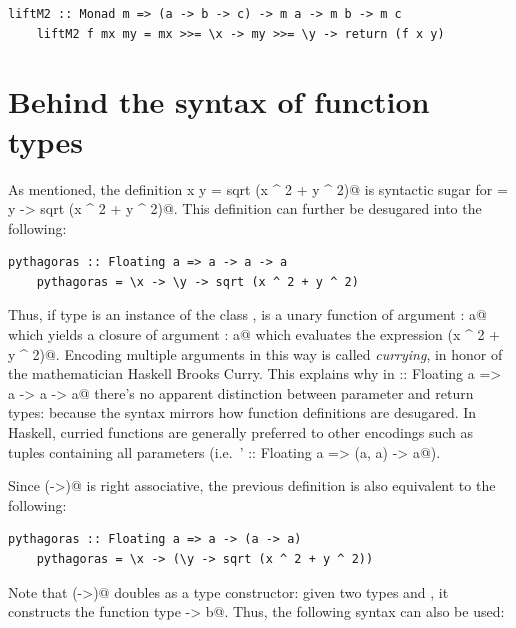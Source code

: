 \documentclass[UdineBachThesis,american,11pt]{PhdThesis}
\begin{document}
  \begin{lstlisting}[gobble=4,basicstyle=\ttfamily\small]
    liftM2 :: Monad m => (a -> b -> c) -> m a -> m b -> m c
    liftM2 f mx my = mx >>= \x -> my >>= \y -> return (f x y)
  \end{lstlisting}

  \newpage

  \section{Behind the syntax of function types}

  As mentioned, the definition \lstinline@pythagoras x y = sqrt (x ^ 2 + y ^ 2)@
  is syntactic sugar for \lstinline@pythagoras = \x y -> sqrt (x ^ 2 + y ^ 2)@.
  This definition can further be desugared into the following:

  \begin{lstlisting}[gobble=4,basicstyle=\ttfamily\small]
    pythagoras :: Floating a => a -> a -> a
    pythagoras = \x -> \y -> sqrt (x ^ 2 + y ^ 2)
  \end{lstlisting}

  Thus, if type \lstinline@a@ is an instance of the class \lstinline@Floating@,
  \lstinline@pythagoras@ is a unary function of argument \lstinline@x : a@ which
  yields a closure of argument \lstinline@y : a@ which evaluates the expression
  \lstinline@sqrt (x ^ 2 + y ^ 2)@. Encoding multiple arguments in this way is
  called \emph{currying}, in honor of the mathematician Haskell Brooks Curry.
  This explains why in \lstinline@pythagoras :: Floating a => a -> a -> a@
  there's no apparent distinction between parameter and return types: because
  the syntax mirrors how function definitions are desugared. In Haskell, curried
  functions are generally preferred to other encodings such as tuples containing
  all parameters (i.e.\ \lstinline@pythagoras' :: Floating a => (a, a) -> a@).

  Since \lstinline@(->)@ is right associative, the previous definition is also
  equivalent to the following:

  \begin{lstlisting}[gobble=4,basicstyle=\ttfamily\small]
    pythagoras :: Floating a => a -> (a -> a)
    pythagoras = \x -> (\y -> sqrt (x ^ 2 + y ^ 2))
  \end{lstlisting}

  Note that \lstinline@(->)@ doubles as a type constructor: given two types
  \lstinline@a@ and \lstinline@b@, it constructs the function type
  \lstinline@a -> b@. Thus, the following syntax can also be used:
\end{document}
